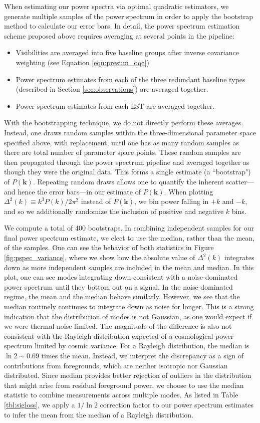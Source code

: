 \documentclass[twocolumn,numberedappendix]{emulateapj} \shorttitle{New Limits on the 21 cm Power Spectrum at $z=8.4$}
\begin{document}
When estimating our power spectra via optimal quadratic estimators, we generate
multiple samples of the power spectrum in order to apply the bootstrap method to
calculate our error bars. In detail, the power spectrum estimation scheme proposed
above requires averaging at several points in the pipeline:
\begin{itemize}
\item Visibilities are averaged into five baseline groups after inverse covariance weighting (see Equation \eqref{eqn:presum_oqe})
\item Power spectrum estimates from each of the three redundant baseline types (described in Section \ref{sec:observations}) are averaged together.
\item Power spectrum estimates from each LST are averaged together.
\end{itemize}
With the bootstrapping technique, we do not directly perform these averages. Instead,
one draws random samples within the three-dimensional parameter space specified above,
with replacement, until one has as many random samples as there are total number of parameter
space points. These random samples are then propagated through the power spectrum pipeline
and averaged together as though they were the original data. This forms a single estimate (a ``bootstrap") of $P(\mathbf{k})$. Repeating 
random draws allows one to quantify the inherent scatter---and hence the error bars---in our
estimate of $P(\mathbf{k})$. When plotting $\Delta^2 (k) \equiv k^3 P(k) / 2 \pi^2$ instead of
$P(\mathbf{k})$, we bin power falling in $+k$ and $-k$, and so 
we additionally randomize the inclusion of 
positive and negative $k$ bins.

We compute a total of 400 bootstraps. In combining independent samples for our final power spectrum
estimate, we elect to use the median, rather than the mean, of the samples. One can see the behavior 
of both statistics in Figure \ref{fig:pspec_variance}, where we
show how the absolute value of $\Delta^2(k)$ integrates down as more independent samples are included in the mean and median.
In this plot, one can see modes integrating down 
consistent with a noise-dominated power spectrum until they bottom out on a signal.
In the noise-dominated regime, the mean and the median
behave similarly.  However, we see that the median routinely continues to integrate down as noise for longer.
This is a strong indication that the distribution of modes is not Gaussian, as one would expect
if we were thermal-noise limited.  The magnitude of the difference
is also not consistent with the Rayleigh distribution expected of a cosmological power spectrum limited by cosmic
variance.  
For a Rayleigh distribution, the median is $\ln2 \sim 0.69$ times the mean. 
Instead, we interpret the discrepancy as a sign of contributions from foregrounds, which are neither isotropic 
nor Gaussian distributed.  Since median provides 
better rejection of outliers in the distribution that might arise from residual foreground power, we choose to use
the median statistic to combine measurements across multiple modes.
As listed in Table \ref{tbl:sigloss}, we apply a $1/\ln2$ correction factor to our power spectrum estimates to 
infer the mean from the median of a Rayleigh distribution.
\end{document}
